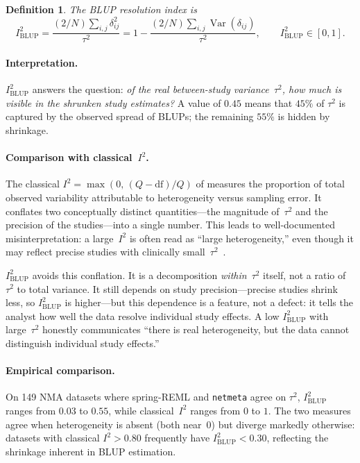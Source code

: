 \documentclass[12pt]{article}
\newcommand{\Var}{\operatorname{Var}}
\newtheorem{definition}{Definition}
\begin{document}
\begin{definition}
The \emph{BLUP resolution index} is
\begin{equation}\label{eq:i2blup}
  I^2_{\mathrm{BLUP}}
    = \frac{(2/N)\sum_{i,j}\delta_{ij}^2}{\tau^2}
    = 1 - \frac{(2/N)\sum_{i,j}\Var(\delta_{ij})}{\tau^2},
  \qquad I^2_{\mathrm{BLUP}} \in [0,1].
\end{equation}
\end{definition}

\paragraph{Interpretation.}
$I^2_{\mathrm{BLUP}}$ answers the question: \emph{of the real
between-study variance~$\tau^2$, how much is visible in the shrunken
study estimates?}  A value of $0.45$ means that $45\%$ of $\tau^2$ is
captured by the observed spread of BLUPs; the remaining $55\%$ is
hidden by shrinkage.

\paragraph{Comparison with classical~$I^2$.}
The classical $I^2 = \max(0,\,(Q - \mathrm{df})/Q)$ of
\citet{Higgins2002} measures the proportion of total observed
variability attributable to heterogeneity versus sampling error.  It
conflates two conceptually distinct quantities---the magnitude
of~$\tau^2$ and the precision of the studies---into a single number.
This leads to well-documented misinterpretation: a large~$I^2$ is often
read as ``large heterogeneity,'' even though it may reflect precise
studies with clinically small~$\tau^2$~\citep{Ruecker2008,BorensteinBook2009}.

$I^2_{\mathrm{BLUP}}$ avoids this conflation.  It is a decomposition
\emph{within}~$\tau^2$ itself, not a ratio of $\tau^2$ to total
variance.  It still depends on study precision---precise studies shrink
less, so $I^2_{\mathrm{BLUP}}$ is higher---but this dependence is a
feature, not a defect: it tells the analyst how well the data resolve
individual study effects.  A low $I^2_{\mathrm{BLUP}}$ with
large~$\tau^2$ honestly communicates ``there is real heterogeneity, but
the data cannot distinguish individual study effects.''

\paragraph{Empirical comparison.}
On 149 NMA datasets where spring-REML and \texttt{netmeta} agree on
$\tau^2$, $I^2_{\mathrm{BLUP}}$ ranges from $0.03$ to $0.55$, while
classical~$I^2$ ranges from $0$ to $1$.  The two measures agree when
heterogeneity is absent (both near~$0$) but diverge markedly otherwise:
datasets with classical $I^2 > 0.80$ frequently have
$I^2_{\mathrm{BLUP}} < 0.30$, reflecting the shrinkage inherent in
BLUP estimation.
\end{document}
